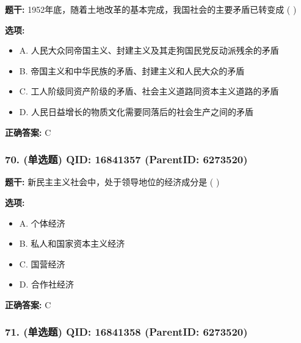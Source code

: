\documentclass[12pt,UTF8]{ctexart}
\begin{document}
\textbf{题干:}
1952年底，随着土地改革的基本完成，我国社会的主要矛盾已转变成 ( )



\textbf{选项:}
\begin{itemize}[leftmargin=*]

  \item A. 人民大众同帝国主义、封建主义及其走狗国民党反动派残余的矛盾

  \item B. 帝国主义和中华民族的矛盾、封建主义和人民大众的矛盾

  \item C. 工人阶级同资产阶级的矛盾、社会主义道路同资本主义道路的矛盾

  \item D. 人民日益增长的物质文化需要同落后的社会生产之间的矛盾

\end{itemize}

\textbf{正确答案:}
C

\vspace{0.3em}\hrulefill\vspace{0.7em}

\subsubsection*{70. (单选题) \small QID: 16841357 (ParentID: 6273520)}

\textbf{题干:}
新民主主义社会中，处于领导地位的经济成分是 ( )



\textbf{选项:}
\begin{itemize}[leftmargin=*]

  \item A. 个体经济

  \item B. 私人和国家资本主义经济

  \item C. 国营经济

  \item D. 合作社经济

\end{itemize}

\textbf{正确答案:}
C

\vspace{0.3em}\hrulefill\vspace{0.7em}

\subsubsection*{71. (单选题) \small QID: 16841358 (ParentID: 6273520)}
\end{document}
